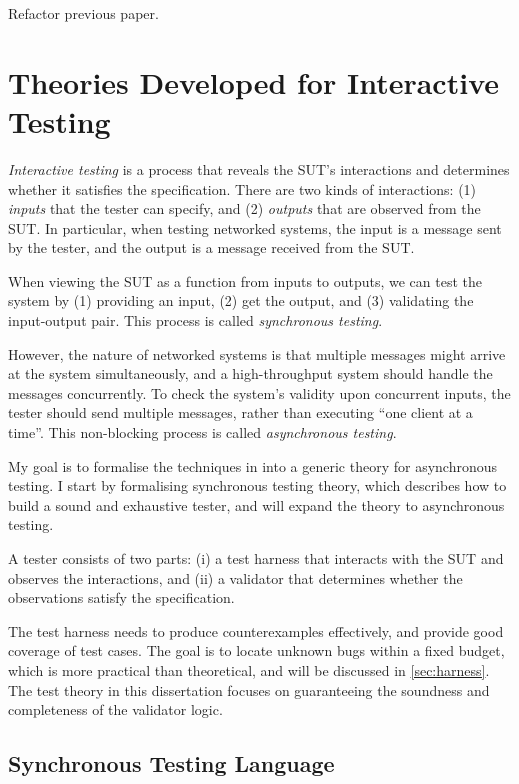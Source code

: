 \documentclass{article}
\theoremstyle{definition}
\begin{document}
Refactor previous paper.

\section{Theories Developed for Interactive Testing}
{\em Interactive testing} is a process that reveals the SUT's interactions and
determines whether it satisfies the specification.  There are two kinds of
interactions: (1) {\em inputs} that the tester can specify, and (2) {\em
  outputs} that are observed from the SUT.  In particular, when testing
networked systems, the input is a message sent by the tester, and the output is
a message received from the SUT.

When viewing the SUT as a function from inputs to outputs, we can test the
system by (1) providing an input, (2) get the output, and (3) validating the
input-output pair.  This process is called {\em synchronous testing}.

However, the nature of networked systems is that multiple messages might arrive
at the system simultaneously, and a high-throughput system should handle the
messages concurrently.  To check the system's validity upon concurrent inputs,
the tester should send multiple messages, rather than executing ``one client at
a time''.  This non-blocking process is called {\em asynchronous testing}.

My goal is to formalise the techniques in \textcite{issta21} into a generic
theory for asynchronous testing.  I start by formalising synchronous testing
theory, which describes how to build a sound and exhaustive tester, and will
expand the theory to asynchronous testing.

A tester consists of two parts: (i) a test harness that interacts with the SUT
and observes the interactions, and (ii) a validator that determines whether the
observations satisfy the specification.

The test harness needs to produce counterexamples effectively, and provide good
coverage of test cases.  The goal is to locate unknown bugs within a fixed
budget, which is more practical than theoretical, and will be discussed in
\autoref{sec:harness}.  The test theory in this dissertation focuses on
guaranteeing the soundness and completeness of the validator logic.

\subsection{Synchronous Testing Language}
\end{document}
